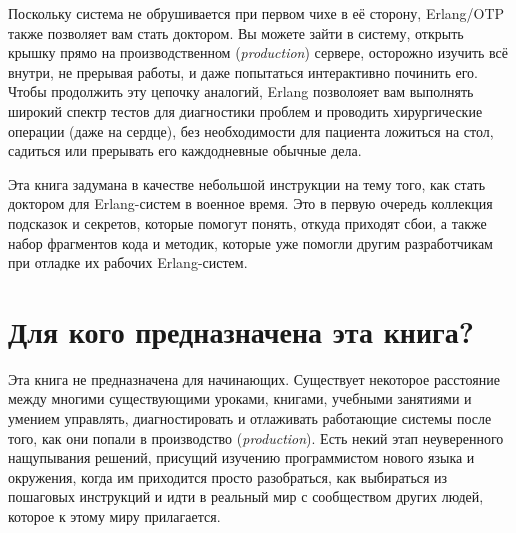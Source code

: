 Поскольку система не обрушивается при первом чихе в её сторону, Erlang/OTP также позволяет вам стать доктором. Вы можете зайти в систему, открыть крышку прямо на производственном (\emph{production}) сервере, осторожно изучить всё внутри, не прерывая работы, и даже попытаться интерактивно починить его. Чтобы продолжить эту цепочку аналогий, Erlang позволояет вам выполнять широкий спектр тестов для диагностики проблем и проводить хирургические операции (даже на сердце), без необходимости для пациента ложиться на стол, садиться или прерывать его каждодневные обычные дела.

Эта книга задумана в качестве небольшой инструкции на тему того, как стать доктором для Erlang-систем в военное время. Это в первую очередь коллекция подсказок и секретов, которые помогут понять, откуда приходят сбои, а также набор фрагментов кода и методик, которые уже помогли другим разработчикам при отладке их рабочих Erlang-систем.



\section*{Для кого предназначена эта книга?}
\label{sec:who-is-this-for}

Эта книга не предназначена для начинающих. Существует некоторое расстояние между многими существующими уроками, книгами, учебными занятиями и умением управлять, диагностировать и отлаживать работающие системы после того, как они попали в производство (\emph{production}). Есть некий этап неуверенного нащупывания решений, присущий изучению программистом нового языка и окружения, когда им приходится просто разобраться, как выбираться из пошаговых инструкций и идти в реальный мир с сообществом других людей, которое к этому миру прилагается.

